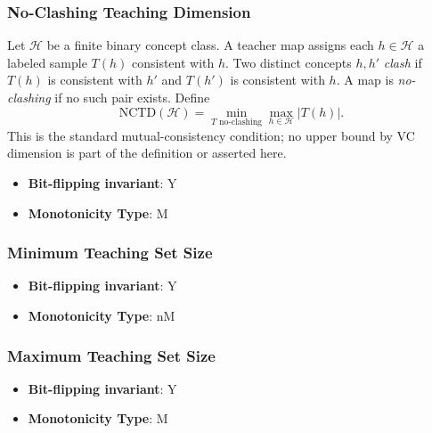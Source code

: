 \subsubsection{No-Clashing Teaching Dimension}
      
      \begin{definition}\label{def:no-clashing_teaching_dimension}
      Let $\mathcal H$ be a finite binary concept class.  A teacher map assigns
      each $h\in\mathcal H$ a labeled sample $T(h)$ consistent with $h$.  Two
      distinct concepts $h,h'$ \emph{clash} if $T(h)$ is consistent with $h'$
      and $T(h')$ is consistent with $h$.  A map is \emph{no-clashing} if no
      such pair exists.  Define
      \[
        \mathrm{NCTD}(\mathcal H)
        =\min_{T\text{ no-clashing}}\max_{h\in\mathcal H}|T(h)|.
      \]
      This is the standard mutual-consistency condition; no upper bound by VC
      dimension is part of the definition or asserted here.
      \end{definition}
      \begin{itemize}
      \item {\bf Bit-flipping invariant}: Y
      \item {\bf Monotonicity Type}: M
      \end{itemize}
\subsubsection{Minimum Teaching Set Size}
      
      \begin{definition}\label{def:minimum_teaching_set_size}
      
      \end{definition}
      \begin{itemize}
      \item {\bf Bit-flipping invariant}: Y
      \item {\bf Monotonicity Type}: nM
      \end{itemize}
\subsubsection{Maximum Teaching Set Size}
      
      \begin{definition}\label{def:maximum_teaching_set_size}
      
      \end{definition}
      \begin{itemize}
      \item {\bf Bit-flipping invariant}: Y
      \item {\bf Monotonicity Type}: M
      \end{itemize}
